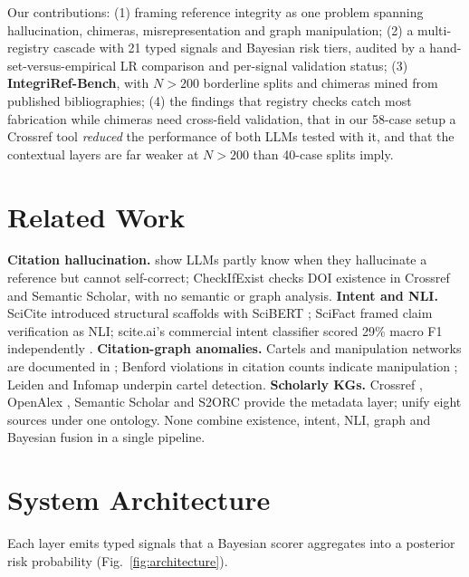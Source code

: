 \documentclass[runningheads]{llncs}
\let\citet\cite
\begin{document}
\noindent Our contributions: (1) framing reference integrity as one problem spanning hallucination, chimeras, misrepresentation and graph manipulation; (2) a multi-registry cascade with 21 typed signals and Bayesian risk tiers, audited by a hand-set-versus-empirical LR comparison and per-signal validation status; (3) \textbf{IntegriRef-Bench}, with $N{>}200$ borderline splits and chimeras mined from published bibliographies; (4) the findings that registry checks catch most fabrication while chimeras need cross-field validation, that in our 58-case setup a Crossref tool \emph{reduced} the performance of both LLMs tested with it, and that the contextual layers are far weaker at $N{>}200$ than 40-case splits imply.

\section{Related Work}

\textbf{Citation hallucination.} \citet{agrawal2024language} show LLMs partly know when they hallucinate a reference but cannot self-correct; CheckIfExist \cite{abbonato2026checkifexist} checks DOI existence in Crossref and Semantic Scholar, with no semantic or graph analysis. \textbf{Intent and NLI.} SciCite \cite{cohan2019structural} introduced structural scaffolds with SciBERT \cite{beltagy2019scibert}; SciFact \cite{wadden2020fact} framed claim verification as NLI; scite.ai's commercial intent classifier scored 29\% macro F1 independently \cite{bakker2023evaluating}. \textbf{Citation-graph anomalies.} Cartels and manipulation networks are documented in \cite{fister2016toward,kojaku2021}; Benford violations in citation counts indicate manipulation \cite{campanario2011benford}; Leiden \cite{traag2019leiden} and Infomap \cite{rosvall2008infomap} underpin cartel detection. \textbf{Scholarly KGs.} Crossref \cite{hendricks2020crossref}, OpenAlex \cite{priem2022openalex}, Semantic Scholar \cite{kinney2023semantic,ammar2018construction} and S2ORC \cite{lo2020s2orc} provide the metadata layer; \citet{wilinski2026datalake} unify eight sources under one ontology. None combine existence, intent, NLI, graph and Bayesian fusion in a single pipeline.

\section{System Architecture}

Each layer emits typed signals that a Bayesian scorer aggregates into a posterior risk probability (Fig.~\ref{fig:architecture}).
\end{document}
